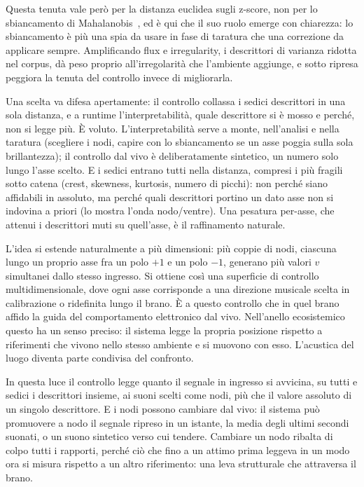 \documentclass{article}
\begin{document}
Questa tenuta vale però per la distanza euclidea sugli z-score, non per lo sbiancamento di Mahalanobis~\cite{mahalanobis1936generalised}, ed è qui che il suo ruolo emerge con chiarezza: lo sbiancamento è più una spia da usare in fase di taratura che una correzione da applicare sempre. Amplificando flux e irregularity, i descrittori di varianza ridotta nel corpus, dà peso proprio all'irregolarità che l'ambiente aggiunge, e sotto ripresa peggiora la tenuta del controllo invece di migliorarla.

Una scelta va difesa apertamente: il controllo collassa i sedici descrittori in una sola distanza, e a runtime l'interpretabilità, quale descrittore si è mosso e perché, non si legge più. È voluto. L'interpretabilità serve a monte, nell'analisi e nella taratura (scegliere i nodi, capire con lo sbiancamento se un asse poggia sulla sola brillantezza); il controllo dal vivo è deliberatamente sintetico, un numero solo lungo l'asse scelto. E i sedici entrano tutti nella distanza, compresi i più fragili sotto catena (crest, skewness, kurtosis, numero di picchi): non perché siano affidabili in assoluto, ma perché quali descrittori portino un dato asse non si indovina a priori (lo mostra l'onda nodo/ventre). Una pesatura per-asse, che attenui i descrittori muti su quell'asse, è il raffinamento naturale.

L'idea si estende naturalmente a più dimensioni: più coppie di nodi, ciascuna lungo un proprio asse fra un polo $+1$ e un polo $-1$, generano più valori $v$ simultanei dallo stesso ingresso. Si ottiene così una superficie di controllo multidimensionale, dove ogni asse corrisponde a una direzione musicale scelta in calibrazione o ridefinita lungo il brano. È a questo controllo che in quel brano affido la guida del comportamento elettronico dal vivo. Nell'anello ecosistemico questo ha un senso preciso: il sistema legge la propria posizione rispetto a riferimenti che vivono nello stesso ambiente e si muovono con esso. L'acustica del luogo diventa parte condivisa del confronto.

In questa luce il controllo legge quanto il segnale in ingresso si avvicina, su tutti e sedici i descrittori insieme, ai suoni scelti come nodi, più che il valore assoluto di un singolo descrittore. E i nodi possono cambiare dal vivo: il sistema può promuovere a nodo il segnale ripreso in un istante, la media degli ultimi secondi suonati, o un suono sintetico verso cui tendere. Cambiare un nodo ribalta di colpo tutti i rapporti, perché ciò che fino a un attimo prima leggeva in un modo ora si misura rispetto a un altro riferimento: una leva strutturale che attraversa il brano.
\end{document}
